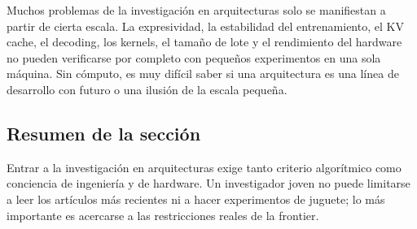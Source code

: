 Muchos problemas de la investigación en arquitecturas solo se manifiestan a partir de cierta escala. La expresividad, la estabilidad del entrenamiento, el KV cache, el decoding, los kernels, el tamaño de lote y el rendimiento del hardware no pueden verificarse por completo con pequeños experimentos en una sola máquina. Sin cómputo, es muy difícil saber si una arquitectura es una línea de desarrollo con futuro o una ilusión de la escala pequeña.

\subsection{Resumen de la sección}

Entrar a la investigación en arquitecturas exige tanto criterio algorítmico como conciencia de ingeniería y de hardware. Un investigador joven no puede limitarse a leer los artículos más recientes ni a hacer experimentos de juguete; lo más importante es acercarse a las restricciones reales de la frontier.
